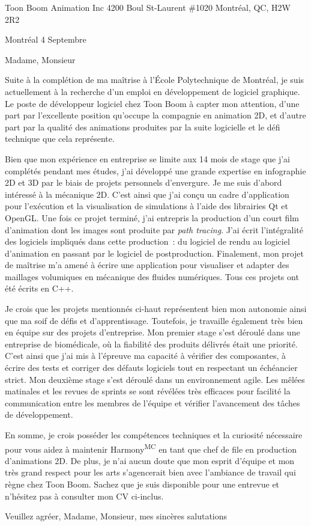\insertcvheader

\clurecipient
	{Toon Boom Animation Inc}
	{4200 Boul St-Laurent \#1020}
	{Montréal, QC, H2W 2R2}
	
\cllocationdate
	{Montréal}
	{4 Septembre}
	
\clgreeting
	{Madame, Monsieur}
	
Suite à la complétion de ma maîtrise à l'École Polytechnique de Montréal, je suis actuellement à la recherche d'un emploi en développement de logiciel graphique. Le poste de développeur logiciel chez Toon Boom à capter mon attention, d'une part par l'excellente position qu'occupe la compagnie en animation 2D, et d'autre part par la qualité des animations produites par la suite logicielle et le défi technique que cela représente.
	
Bien que mon expérience en entreprise se limite aux 14 mois de stage que j'ai complétés pendant mes études, j'ai développé une grande expertise en infographie 2D et 3D par le biais de projets personnels d'envergure. Je me suis d'abord intéressé à la mécanique 2D. C'est ainsi que j'ai conçu un cadre d'application pour l'exécution et la visualisation de simulations à l'aide des librairies Qt et OpenGL. Une fois ce projet terminé, j'ai entrepris la production d'un court film d'animation dont les images sont produite par \textit{path tracing}. J'ai écrit l'intégralité des logiciels impliqués dans cette production~: du logiciel de rendu au logiciel d'animation en passant par le logiciel de postproduction. Finalement, mon projet de maîtrise m'a amené à écrire une application pour visualiser et adapter des maillages volumiques en mécanique des fluides numériques. Tous ces projets ont été écrits en C++.

Je crois que les projets mentionnés ci-haut représentent bien mon autonomie ainsi que ma soif de défis et d'apprentissage. Toutefois, je travaille également très bien en équipe sur des projets d'entreprise. Mon premier stage s'est déroulé dans une entreprise de biomédicale, où la fiabilité des produits délivrés était une priorité. C'est ainsi que j'ai mis à l'épreuve ma capacité à vérifier des composantes, à écrire des tests et corriger des défauts logiciels tout en respectant un échéancier strict. Mon deuxième stage s'est déroulé dans un environnement agile. Les mêlées matinales et les revues de sprints se sont révélées très efficaces pour facilité la communication entre les membres de l'équipe et vérifier l'avancement des tâches de développement.

En somme, je crois posséder les compétences techniques et la curiosité nécessaire pour vous aidez à maintenir Harmony\textsuperscript{MC} en tant que chef de file en production d'animations 2D. De plus, je n'ai aucun doute que mon esprit d'équipe et mon très grand respect pour les arts s'agencerait bien avec l'ambiance de travail qui règne chez Toon Boom. Sachez que je suis disponible pour une entrevue et n'hésitez pas à consulter mon CV ci-inclus.

Veuillez agréer, Madame, Monsieur, mes sincères salutations

